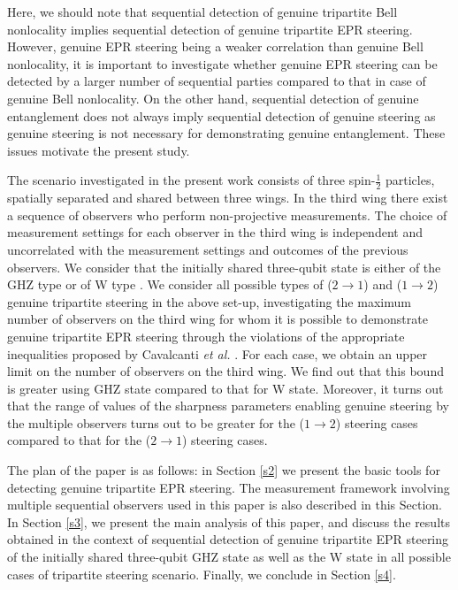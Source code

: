 \documentclass[pra,a4paper,aps,twocolumn,showpacs,superscriptaddress,groupedaddress]{revtex4}
\begin{document}
 Here, we should note that sequential detection of genuine tripartite Bell nonlocality \cite{Saha} implies sequential detection of genuine tripartite EPR steering. However, genuine EPR steering being a weaker correlation than genuine Bell nonlocality, it is important to investigate whether genuine EPR steering can be detected by a larger number of sequential parties compared to that in case of genuine Bell nonlocality. On the other hand, sequential detection of genuine entanglement \cite{Maity2} does not always imply sequential detection of genuine steering as genuine steering is not necessary for demonstrating genuine entanglement. These issues motivate the present study. 

The scenario investigated in the present work consists of three spin-$\frac{1}{2}$ particles, spatially separated and shared between three wings. In the third wing there exist a sequence of observers  who perform non-projective measurements. The choice of measurement settings for each observer in the third wing is independent and uncorrelated with the measurement settings and outcomes of the previous observers. We consider that the initially shared three-qubit state is either of the GHZ type \cite{GHZ} or of W type \cite{wstate}. We consider all possible types of ($2\rightarrow1$) and ($1\rightarrow2$) genuine tripartite steering in the above set-up, investigating the maximum number  of  observers on the third wing for whom it is possible to demonstrate genuine tripartite EPR steering through the violations of the appropriate inequalities proposed by Cavalcanti \textit{et al.}  \cite{Daniel}. For each case, we obtain an upper limit on the number of observers on the third wing. We find out that this bound is greater using GHZ state compared to that for W state. Moreover, it turns out that the range of values of the sharpness parameters enabling genuine steering by the multiple observers turns out to be greater for the ($1 \rightarrow 2$) steering cases  compared to that for the ($2 \rightarrow 1$) steering cases.


The plan of the paper is as follows: in Section \ref{s2} we present the basic tools for detecting genuine tripartite EPR steering. The measurement framework involving multiple sequential observers used in this paper is also described in this Section. In Section \ref{s3}, we present the main analysis of this paper, and discuss the results obtained in the context of sequential detection of genuine tripartite EPR steering of the initially shared three-qubit GHZ state as well as the W state in all possible cases of tripartite steering scenario. Finally, we conclude in Section \ref{s4}.
\end{document}
